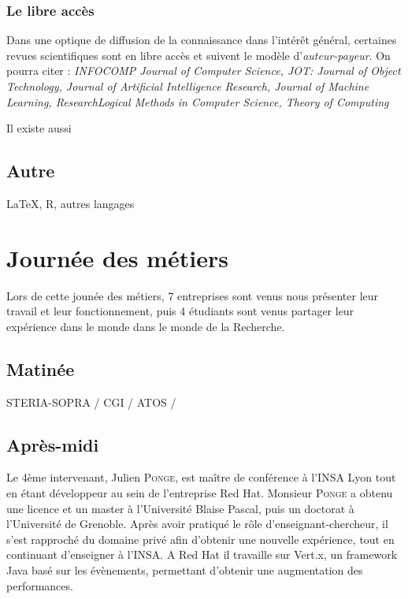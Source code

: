 \documentclass[14pt, a4paper]{report}
\begin{document}
  \subsection{Le libre accès}

  Dans une optique de diffusion de la connaissance dans l'intérêt général, certaines revues scientifiques sont en libre accès et suivent le modèle d'\emph{auteur-payeur}.
  On pourra citer : \emph{INFOCOMP Journal of Computer Science, JOT: Journal of Object Technology, Journal of Artificial Intelligence Research, Journal of Machine Learning, ResearchLogical Methods in Computer Science, Theory of Computing}

  Il existe aussi 

  
  \section{Autre}

  \LaTeX , R, autres langages

\chapter{Journée des métiers}



Lors de cette jounée des métiers, 7 entreprises sont venus nous présenter leur travail et leur fonctionnement, puis 4 étudiants sont venus partager leur expérience dans le monde dans le monde de la Recherche.

\section{Matinée}

STERIA-SOPRA / CGI / ATOS / 

\section{Après-midi}

Le 4ème intervenant, Julien \textsc{Ponge}, est maître de conférence à l'INSA Lyon tout en étant développeur au sein de l'entreprise Red Hat. Monsieur \textsc{Ponge} a obtenu une licence et un master à l'Université Blaise Pascal, puis un doctorat à l'Université de Grenoble. Après avoir pratiqué le rôle d'enseignant-chercheur, il s'est rapproché du domaine privé afin d'obtenir une nouvelle expérience, tout en continuant d'enseigner à l'INSA. A Red Hat il travaille sur Vert.x, un framework Java basé sur les évènements, permettant d'obtenir une augmentation des performances.
\end{document}
